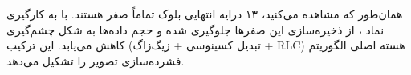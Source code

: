 \begin{stepbox}
{\begin{tipbox}
همان‌طور که مشاهده می‌کنید، ۱۳ درایه انتهایی بلوک تماماً صفر هستند. با به کارگیری نماد ، از ذخیره‌سازی این صفرها جلوگیری شده و حجم داده‌ها به شکل چشم‌گیری کاهش می‌یابد. این ترکیب (تبدیل کسینوسی + زیگ‌زاگ + RLC) هسته اصلی الگوریتم فشرده‌سازی تصویر  را تشکیل می‌دهد.
\end{tipbox}
}
\end{stepbox}

